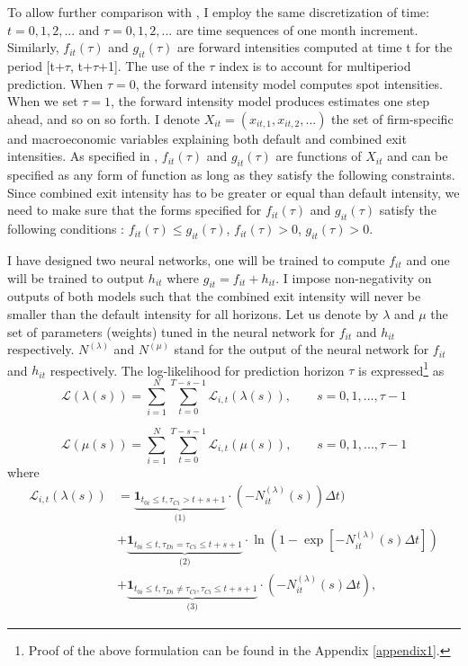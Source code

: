 To allow further comparison with \citet{Duan2012},  I employ the same discretization of time: $t = 0, 1, 2,...$ and $\tau = 0, 1, 2,...$ are time sequences of one month increment. Similarly, $f_{it}(\tau)$ and $g_{it}(\tau)$ are forward intensities computed at time t for the period [t+$\tau$, t+$\tau$+1]. The use of the $\tau$ index is to account for multiperiod prediction. When $\tau = 0$, the forward intensity model computes spot intensities. When we set $\tau = 1$, the forward intensity model produces estimates one step ahead, and so on so forth. I denote $X_{it} = (x_{it,1}, x_{it,2} ,...)$ the set of firm-specific and macroeconomic variables explaining both default and combined exit intensities. As specified in \citet{Duan2012}, $f_{it}(\tau)$ and $g_{it}(\tau)$ are functions of $X_{it}$ and can be specified as any form of function as long as they satisfy the following constraints. Since combined exit intensity has to be greater or equal than default intensity, we need to make sure that the forms specified for $f_{it}(\tau)$ and $g_{it}(\tau)$ satisfy the following conditions : $f_{it}(\tau) \leq g_{it}(\tau)$, $f_{it}(\tau) > 0$, $g_{it}(\tau) > 0$. 

I have designed two neural networks, one will be trained to compute $f_{it}$ and one will be trained to output $h_{it}$ where $g_{it} = f_{it} + h_{it}$. I impose non-negativity on outputs of both models such that the combined exit intensity will never be smaller than the default intensity for all horizons. Let us denote by $\lambda$ and $\mu$ the set of parameters (weights) tuned in the neural network for $f_{it}$ and $h_{it}$ respectively. $N^{(\lambda)}$ and $N^{(\mu)}$ stand for the output of the neural network for $f_{it}$ and $h_{it}$ respectively. The log-likelihood for prediction horizon $\tau$ is expressed\footnote{Proof of the above formulation can be found in the Appendix \ref{appendix1}.} as
\begin{equation} \label{decomp1}
\mathcal{L}(\lambda(s)) = \sum_{i=1}^N \sum_{t=0}^{T-s-1} \mathcal{L}_{i,t}(\lambda(s)), \qquad s = 0,1,...,\tau-1
\end{equation}

\begin{equation} \label{decomp2}
\mathcal{L}(\mu(s)) = \sum_{i=1}^N \sum_{t=0}^{T-s-1} \mathcal{L}_{i,t}(\mu(s)), \qquad s = 0,1,...,\tau-1
\end{equation}
where 
\begin{align} \label{small_lik_f}
\mathcal{L}_{i,t}(\lambda(s)) &= \underbrace{\textbf{1}_{t_{0i} \leq t,\tau_{Ci} > t + s +1}}_\textrm{(1)} \cdot (-N_{it}^{(\lambda)}(s)) \Delta t)\\ \nonumber
&+ \underbrace{\textbf{1}_{t_{0i} \leq t, \tau_{Di}=\tau_{Ci} \leq t+s+1}}_\textrm{(2)} \cdot \ln(1-\exp[-N_{it}^{(\lambda)}(s)\Delta t]) \\
&+ \underbrace{\textbf{1}_{t_{0i} \leq t, \tau_{Di} \neq \tau_{Ci}, \tau_{Ci} \leq t+s+1}}_\textrm{(3)} \cdot (-N_{it}^{(\lambda)}(s)\Delta t) \nonumber,
\end{align}


